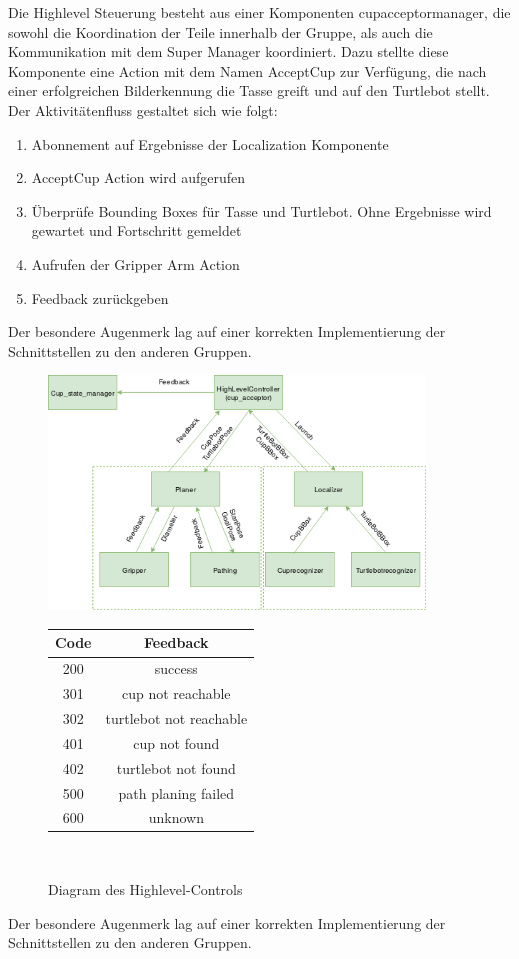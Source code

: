 Die Highlevel Steuerung besteht aus einer Komponenten \glqq cup\textunderscore acceptor\textunderscore manager\grqq, die sowohl die Koordination der Teile innerhalb der Gruppe, als auch die Kommunikation mit dem Super Manager koordiniert. Dazu stellte diese Komponente eine Action mit dem Namen AcceptCup zur Verfügung, die nach einer erfolgreichen Bilderkennung die Tasse greift und auf den Turtlebot stellt. Der Aktivitätenfluss gestaltet sich wie folgt:
\begin{enumerate}
\item Abonnement auf Ergebnisse der Localization Komponente
\item AcceptCup Action wird aufgerufen
\item Überprüfe Bounding Boxes für Tasse und Turtlebot. Ohne Ergebnisse wird gewartet und Fortschritt gemeldet
\item Aufrufen der Gripper Arm Action

\item Feedback zurückgeben
\end{enumerate}

Der besondere Augenmerk lag auf einer korrekten Implementierung der Schnittstellen zu den anderen Gruppen.

\begin{figure}
\centering
\begin{minipage}[t]{.5\textwidth}
\centering
\vspace{0pt}
\includegraphics[width=10cm]{./images/highlevel_Diagram.png}
\caption{Diagram des Highlevel-Controls}
\end{minipage}\hfill
\begin{minipage}[t]{.3\textwidth}

\hfill

\centering
\vspace{0pt}
\begin{tabular}{ |c|c| }
 \hline
 Code & Feedback \\ 
 \hline
 200 & success \\ 
 301 & cup not reachable \\ 
 302 & turtlebot not reachable \\
 401 & cup not found \\
 402 & turtlebot not found \\
 500 & path planing failed \\
 600 & unknown \\ 
 \hline
\end{tabular}\\
\end{minipage}
\end{figure}

Der besondere Augenmerk lag auf einer korrekten Implementierung der Schnittstellen zu den anderen Gruppen.
